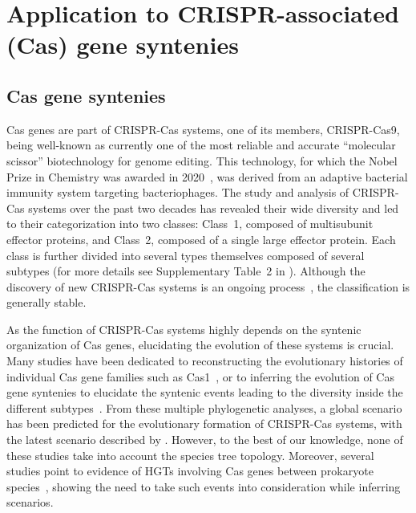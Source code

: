 \section{Application to CRISPR-associated (Cas) gene syntenies}\label{sec:superdtl:crispr}

\subsection{Cas gene syntenies}

Cas genes are part of CRISPR-Cas systems, one of its members, CRISPR-Cas9, being well-known as currently one of the most reliable and accurate \enquote{molecular scissor} biotechnology for genome editing.
This technology, for which the Nobel Prize in Chemistry was awarded in 2020~\parencite{Jinek2012ProgrammableDualRNA}, was derived from an adaptive bacterial immunity system targeting bacteriophages.
The study and analysis of CRISPR-Cas systems over the past two decades has revealed their wide diversity and led to their categorization into two classes: Class~1, composed of multisubunit effector proteins, and Class~2, composed of a single large effector protein.
Each class is further divided into several types themselves composed of several subtypes (for more details see Supplementary Table~2 in \textcite{Makarova2020EvolutionaryClassificationCRISPR}).
Although the discovery of new CRISPR-Cas systems is an ongoing process~\parencite{Koonin2022EvolutionaryPlasticityFunctional}, the classification is generally stable.

As the function of CRISPR-Cas systems highly depends on the syntenic organization of Cas genes, elucidating the evolution of these systems is crucial.
Many studies have been dedicated to reconstructing the evolutionary histories of individual Cas gene families such as Cas1~\parencite{Horvath2009ComparativeAnalysisCRISPR}, or to inferring the evolution of Cas gene syntenies to elucidate the syntenic events leading to the diversity inside the different subtypes~\parencite{Koonin2019OriginsEvolutionCRISPR,Makarova2020EvolutionaryClassificationCRISPR,MoyaBeltran2021EvolutionTypeIV}.
From these multiple phylogenetic analyses, a global scenario has been predicted for the evolutionary formation of CRISPR-Cas systems, with the latest scenario described by \textcite{Koonin2022EvolutionaryPlasticityFunctional}.
However, to the best of our knowledge, none of these studies take into account the species tree topology.
Moreover, several studies point to evidence of HGTs involving Cas genes between prokaryote species~\parencite{Godde2006RepetitiveDNAElements,Tyson2008RapidlyEvolvingCRISPRs,Horvath2009ComparativeAnalysisCRISPR,Chakraborty2010ComparativeNetworkClustering}, showing the need to take such events into consideration while inferring scenarios.

